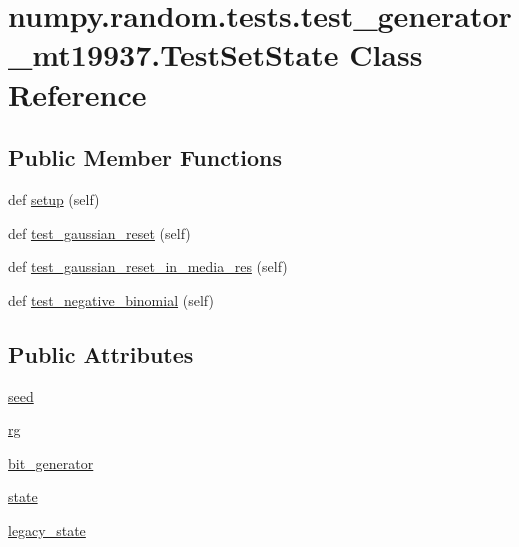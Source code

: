 \hypertarget{classnumpy_1_1random_1_1tests_1_1test__generator__mt19937_1_1TestSetState}{}\section{numpy.\+random.\+tests.\+test\+\_\+generator\+\_\+mt19937.\+Test\+Set\+State Class Reference}
\label{classnumpy_1_1random_1_1tests_1_1test__generator__mt19937_1_1TestSetState}
\subsection*{Public Member Functions}
\begin{DoxyCompactItemize}
\item 
def \hyperlink{classnumpy_1_1random_1_1tests_1_1test__generator__mt19937_1_1TestSetState_a070f7dcb3fb69017a6214d26b06ef971}{setup} (self)
\item 
def \hyperlink{classnumpy_1_1random_1_1tests_1_1test__generator__mt19937_1_1TestSetState_a35ca553f99864164c716e1b605cc06ae}{test\+\_\+gaussian\+\_\+reset} (self)
\item 
def \hyperlink{classnumpy_1_1random_1_1tests_1_1test__generator__mt19937_1_1TestSetState_aa5a3c74892101f2880054bf74d3cbe7c}{test\+\_\+gaussian\+\_\+reset\+\_\+in\+\_\+media\+\_\+res} (self)
\item 
def \hyperlink{classnumpy_1_1random_1_1tests_1_1test__generator__mt19937_1_1TestSetState_ad65a38b0afa2fecc6bb9ca2b4dcefab8}{test\+\_\+negative\+\_\+binomial} (self)
\end{DoxyCompactItemize}
\subsection*{Public Attributes}
\begin{DoxyCompactItemize}
\item 
\hyperlink{classnumpy_1_1random_1_1tests_1_1test__generator__mt19937_1_1TestSetState_a5dee8308cfa98d01f018e5f964f32b7c}{seed}
\item 
\hyperlink{classnumpy_1_1random_1_1tests_1_1test__generator__mt19937_1_1TestSetState_a6996e275aaca65e07b50979d18bc3088}{rg}
\item 
\hyperlink{classnumpy_1_1random_1_1tests_1_1test__generator__mt19937_1_1TestSetState_abaef1386d80bfee9125018a8dced4a92}{bit\+\_\+generator}
\item 
\hyperlink{classnumpy_1_1random_1_1tests_1_1test__generator__mt19937_1_1TestSetState_af02e9795218025713c04013b5ae027e4}{state}
\item 
\hyperlink{classnumpy_1_1random_1_1tests_1_1test__generator__mt19937_1_1TestSetState_a0779602fc855ca34af8f4bb9f36da9d1}{legacy\+\_\+state}
\end{DoxyCompactItemize}


